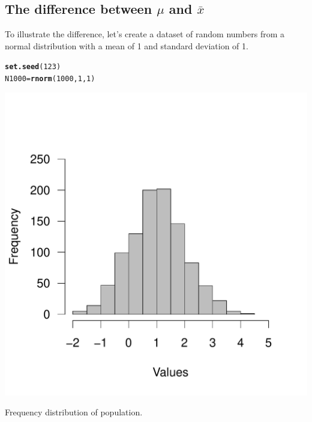 \documentclass{tufte-handout}\usepackage[]{graphicx}\usepackage[]{color}
\makeatletter
\def\maxwidth{ %
  \ifdim\Gin@nat@width>\linewidth
    \linewidth
  \else
    \Gin@nat@width
  \fi
}
\newcommand{\hlnum}[1]{\textcolor[rgb]{0.686,0.059,0.569}{#1}}%
\newcommand{\hlstd}[1]{\textcolor[rgb]{0.345,0.345,0.345}{#1}}%
\newcommand{\hlkwb}[1]{\textcolor[rgb]{0.69,0.353,0.396}{#1}}%
\newcommand{\hlkwd}[1]{\textcolor[rgb]{0.737,0.353,0.396}{\textbf{#1}}}%
\newenvironment{kframe}{%
 \def\at@end@of@kframe{}%
 \ifinner\ifhmode%
  \def\at@end@of@kframe{\end{minipage}}%
  \begin{minipage}{\columnwidth}%
 \fi\fi%
 \def\FrameCommand##1{\hskip\@totalleftmargin \hskip-\fboxsep
 \colorbox{shadecolor}{##1}\hskip-\fboxsep
     \hskip-\linewidth \hskip-\@totalleftmargin \hskip\columnwidth}%
 \MakeFramed {\advance\hsize-\width
   \@totalleftmargin\z@ \linewidth\hsize
   \@setminipage}}%
 {\par\unskip\endMakeFramed%
 \at@end@of@kframe}
\newenvironment{knitrout}{}{} %
\makeatother
\begin{document}
\subsection{The difference between $\mu$ and $\bar{x}$}

To illustrate the difference, let's create a dataset of random numbers from a normal distribution with a mean of 1 and standard deviation of 1. 
\begin{knitrout}
\color{fgcolor}\begin{kframe}
\begin{alltt}
\hlkwd{set.seed}\hlstd{(}\hlnum{123}\hlstd{)}
\hlstd{N1000} \hlkwb{=} \hlkwd{rnorm}\hlstd{(}\hlnum{1000}\hlstd{,} \hlnum{1}\hlstd{,} \hlnum{1}\hlstd{)}
\end{alltt}
\end{kframe}
\end{knitrout}

\begin{marginfigure}
\begin{knitrout}
\color{fgcolor}
\includegraphics[width=\maxwidth]{figure/unnamed-chunk-3-1} 

\end{knitrout}
\caption{Frequency distribution of population.}
\label{fig:hist_pop}
\end{marginfigure}
\end{document}
